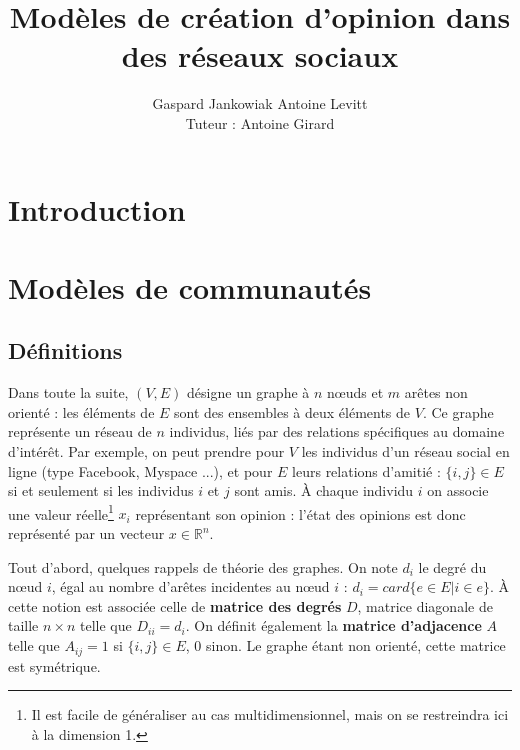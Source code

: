 \documentclass[12pt]{article}
\newcommand{\R}{\mathbb{R}}
\begin{document}
\author{Gaspard Jankowiak \quad Antoine Levitt\\ Tuteur : Antoine Girard}
\title{Modèles de création d'opinion dans des réseaux sociaux}
\maketitle
\vspace{-8mm}
\tableofcontents
\newpage

\section{Introduction}

\section{Modèles de communautés}
\subsection{Définitions}
Dans toute la suite, $(V, E)$ désigne un graphe à $n$ n\oe uds et $m$
arêtes non orienté : les éléments de $E$ sont des ensembles à deux
éléments de $V$. Ce graphe représente un réseau de $n$ individus, liés
par des relations spécifiques au domaine d'intérêt. Par exemple, on
peut prendre pour $V$ les individus d'un réseau social en ligne (type
Facebook, Myspace ...), et pour $E$ leurs relations d'amitié : $\{i,
j\} \in E$ si et seulement si les individus $i$ et $j$ sont amis. À
chaque individu $i$ on associe une valeur réelle\footnote{Il est facile
de généraliser au cas multidimensionnel, mais on se restreindra ici à la
dimension 1.} $x_i$ représentant son opinion : l'état des opinions est
donc représenté par un vecteur $x \in \R^n$.

Tout d'abord, quelques rappels de théorie des graphes. On note $d_i$
le degré du n\oe ud $i$, égal au nombre d'arêtes incidentes au n\oe ud
$i$ : $d_i = card \{e \in E | i \in e\}$. À cette notion est
associée celle de {\bf matrice des degrés} $D$, matrice diagonale
de taille $n \times n$ telle que $D_{i i} = d_i$. On définit
également la {\bf matrice d'adjacence} $A$ telle que $A_{i j} = 1$
si $\{i, j\} \in E$, $0$ sinon. Le graphe étant non orienté, cette
matrice est symétrique.
\end{document}
